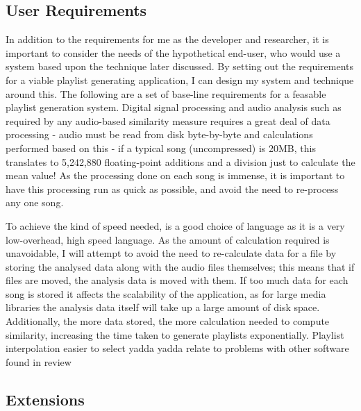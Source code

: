 \subsection{User Requirements}
In addition to the requirements for me as the developer and researcher, it is important to consider the needs of the hypothetical end-user, who would use a system based upon the technique later discussed. By setting out the requirements for a viable playlist generating application, I can design my system and technique around this. The following are a set of base-line requirements for a feasable playlist generation system.
Digital signal processing and audio analysis such as required by any audio-based similarity measure requires a great deal of data processing - audio must be read from disk byte-by-byte and calculations performed based on this - if a typical song (uncompressed) is 20MB, this translates to 5,242,880 floating-point additions and a division just to calculate the mean value! As the processing done on each song is immense, it is important to have this processing run as quick as possible, and avoid the need to re-process any one song.

To achieve the kind of speed needed,  is a good choice of language as it is a very low-overhead, high speed language. As the amount of calculation required is unavoidable, I will attempt to avoid the need to re-calculate data for a file by storing the analysed data along with the audio files themselves; this means that if files are moved, the analysis data is moved with them.
\label{text:spec:requirement:data}
If too much data for each song is stored it affects the scalability of the application, as for large media libraries the analysis data itself will take up a large amount of disk space. Additionally, the more data stored, the more calculation needed to compute similarity, increasing the time taken to generate playlists exponentially.
Playlist interpolation easier to select yadda yadda 
relate to problems with other software found in review
\subsection{Extensions}
